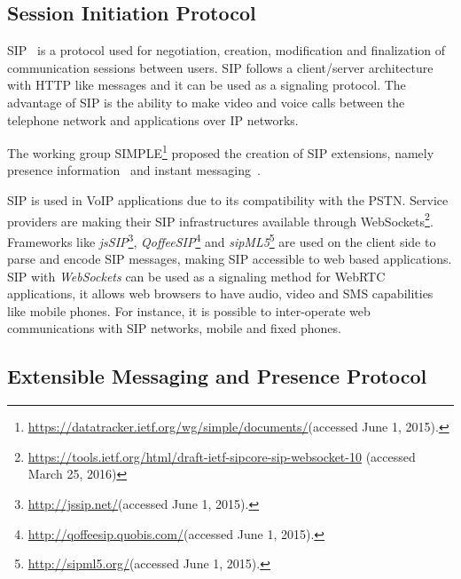   \subsection{Session Initiation Protocol}

  \ac{SIP}~\cite{rfc3261} is a protocol used for negotiation, creation, modification and finalization of communication sessions between users. \ac{SIP} follows a client/server architecture with \ac{HTTP} like messages and it can be used as a signaling protocol. The advantage of \ac{SIP} is the ability to make video and voice calls between the telephone network and applications over \ac{IP} networks.

  The working group \ac{SIMPLE}\footnote{\url{https://datatracker.ietf.org/wg/simple/documents/}(accessed June 1, 2015).} proposed the creation of \ac{SIP} extensions, namely presence information~\cite{rfc5263} and instant messaging~\cite{rfc3428}.

  \ac{SIP} is used in \ac{VoIP} applications due to its compatibility with the \ac{PSTN}.
  Service providers are making their \ac{SIP} infrastructures available through WebSockets\footnote{\url{https://tools.ietf.org/html/draft-ietf-sipcore-sip-websocket-10} (accessed March 25, 2016)}.
  Frameworks like \emph{jsSIP}\footnote{\url{http://jssip.net/}(accessed June 1, 2015).}, \emph{QoffeeSIP}\footnote{\url{http://qoffeesip.quobis.com/}(accessed June 1, 2015).} and \emph{sipML5}\footnote{\url{http://sipml5.org/}(accessed June 1, 2015).} are used on the client side to parse and encode \ac{SIP} messages, making \ac{SIP} accessible to web based applications. 
  \ac{SIP} with \emph{WebSockets} can be used as a signaling method for \ac{WebRTC} applications, it allows web browsers to have audio, video and \ac{SMS} capabilities like mobile phones. For instance, it is possible to inter-operate web communications with \ac{SIP} networks, mobile and fixed phones.

\subsection{Extensible Messaging and Presence Protocol}

